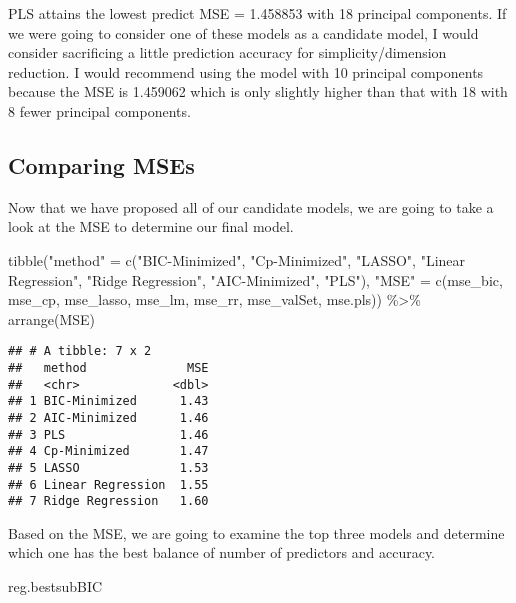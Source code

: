 \documentclass[
]{article}
\newenvironment{Shaded}{\begin{snugshade}}{\end{snugshade}}
\newcommand{\FunctionTok}[1]{\textcolor[rgb]{0.00,0.00,0.00}{#1}}
\newcommand{\NormalTok}[1]{#1}
\newcommand{\OtherTok}[1]{\textcolor[rgb]{0.56,0.35,0.01}{#1}}
\newcommand{\SpecialCharTok}[1]{\textcolor[rgb]{0.00,0.00,0.00}{#1}}
\newcommand{\StringTok}[1]{\textcolor[rgb]{0.31,0.60,0.02}{#1}}
\begin{document}
PLS attains the lowest predict MSE = 1.458853 with 18 principal
components. If we were going to consider one of these models as a
candidate model, I would consider sacrificing a little prediction
accuracy for simplicity/dimension reduction. I would recommend using the
model with 10 principal components because the MSE is 1.459062 which is
only slightly higher than that with 18 with 8 fewer principal
components.

\hypertarget{comparing-mses}{%
\subsection{Comparing MSEs}\label{comparing-mses}}

Now that we have proposed all of our candidate models, we are going to
take a look at the MSE to determine our final model.

\begin{Shaded}
\begin{Highlighting}[]
\FunctionTok{tibble}\NormalTok{(}\StringTok{"method"} \OtherTok{=} \FunctionTok{c}\NormalTok{(}\StringTok{"BIC{-}Minimized"}\NormalTok{, }\StringTok{"Cp{-}Minimized"}\NormalTok{, }\StringTok{"LASSO"}\NormalTok{, }\StringTok{"Linear Regression"}\NormalTok{, }\StringTok{"Ridge Regression"}\NormalTok{, }\StringTok{"AIC{-}Minimized"}\NormalTok{, }\StringTok{"PLS"}\NormalTok{),}
       \StringTok{"MSE"} \OtherTok{=} \FunctionTok{c}\NormalTok{(mse\_bic, mse\_cp, mse\_lasso, mse\_lm, mse\_rr, mse\_valSet, mse.pls)) }\SpecialCharTok{\%\textgreater{}\%}
  \FunctionTok{arrange}\NormalTok{(MSE)}
\end{Highlighting}
\end{Shaded}

\begin{verbatim}
## # A tibble: 7 x 2
##   method              MSE
##   <chr>             <dbl>
## 1 BIC-Minimized      1.43
## 2 AIC-Minimized      1.46
## 3 PLS                1.46
## 4 Cp-Minimized       1.47
## 5 LASSO              1.53
## 6 Linear Regression  1.55
## 7 Ridge Regression   1.60
\end{verbatim}

Based on the MSE, we are going to examine the top three models and
determine which one has the best balance of number of predictors and
accuracy.

\begin{Shaded}
\begin{Highlighting}[]
\NormalTok{reg.bestsubBIC}
\end{Highlighting}
\end{Shaded}
\end{document}
